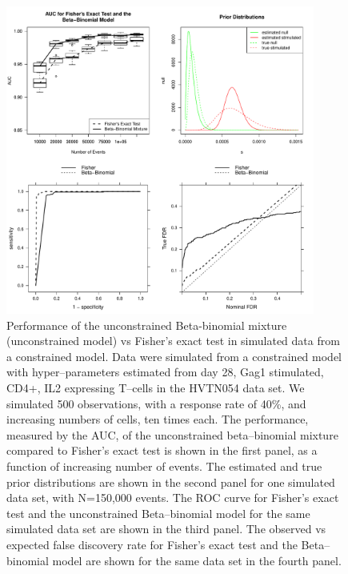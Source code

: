 \documentclass[11pt]{article}
\begin{document}
\begin{figure}[htbp] %
   \centering
   \includegraphics[width=4in]{Figures/simulations_negt} 
   \caption{Performance of the unconstrained Beta-binomial mixture (unconstrained model) vs Fisher's exact test in simulated data from a constrained model. Data were simulated from a constrained model with hyper--parameters estimated from day 28, Gag1 stimulated, CD4+, IL2 expressing T--cells in the HVTN054 data set. We simulated 500 observations, with a response rate of 40\%, and increasing numbers of cells, ten times each. The performance, measured by the AUC, of the unconstrained beta--binomial mixture compared to Fisher's exact test is shown in the first panel, as a function of increasing number of events. The estimated and true prior distributions are shown in the second panel for one simulated data set, with N=150,000 events. The ROC curve for Fisher's exact test and the unconstrained Beta--binomial model for the same simulated data set are shown in the third panel. The observed vs expected false discovery rate for Fisher's exact test and the Beta--binomial model are shown for the same data set in the fourth panel.}
   \label{fig:simulations_negt}
\end{figure}
\end{document}
